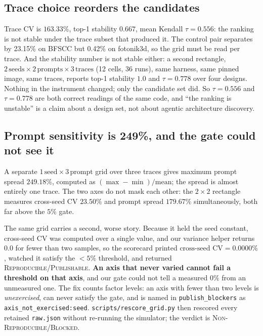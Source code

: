 \documentclass[sigconf,anonymous,nonacm]{acmart}
\begin{document}
\subsection{Trace choice reorders the candidates}
\label{sec:trace}

Trace CV is $163.33\%$, top-1 stability $0.667$, mean Kendall $\tau=0.556$: the ranking is not stable under the trace subset that produced it. The control pair separates by 23.15\% on BFSCC but 0.42\% on fotonik3d, so the grid must be read per trace. And the stability number is not stable either: a second rectangle, $2\,\text{seeds}\times2\,\text{prompts}\times3\,\text{traces}$ (12 cells, 36 runs), same harness, same pinned image, same traces, reports top-1 stability $\mathbf{1.0}$ and $\tau=\mathbf{0.778}$ over four designs. Nothing in the instrument changed; only the candidate set did. So $\tau=0.556$ and $\tau=0.778$ are both correct readings of the same code, and ``the ranking is unstable'' is a claim about a design set, not about agentic architecture discovery.

\subsection{Prompt sensitivity is 249\%, and the gate could not see it}
\label{sec:prompt}

A separate $1\,\text{seed}\times3\,\text{prompt}$ grid over three traces gives maximum prompt spread $\mathbf{249.18\%}$, computed as $(\max-\min)/\text{mean}$; the spread is almost entirely one trace. The two axes do not mask each other: the $2\times2$ rectangle measures cross-seed CV $\mathbf{23.50\%}$ and prompt spread $\mathbf{179.67\%}$ simultaneously, both far above the $5\%$ gate.

The same grid carries a second, worse story. Because it held the seed constant, cross-seed CV was computed over a single value, and our variance helper returns $0.0$ for fewer than two samples, so the scorecard printed $\text{cross-seed CV}=0.0000\%$, watched it satisfy the $<5\%$ threshold, and returned \textsc{Reproducible}/\textsc{Publishable}. \textbf{An axis that never varied cannot fail a threshold on that axis}, and our gate could not tell a measured $0\%$ from an unmeasured one. The fix counts factor levels: an axis with fewer than two levels is \emph{unexercised}, can never satisfy the gate, and is named in \texttt{publish\_blockers} as \texttt{axis\_not\_exercised:seed}. \texttt{scripts/rescore\_grid.py} then rescored every retained \texttt{raw.json} without re-running the simulator; the verdict is \textsc{Non-Reproducible}/\textsc{Blocked}.
\end{document}
